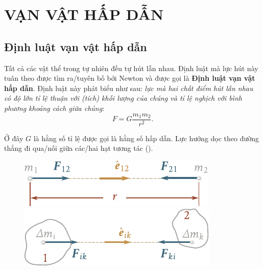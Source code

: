 








\chapter{VẠN VẬT HẤP DẪN}\label{chap:6}

\section{Định luật vạn vật hấp dẫn}\label{sec:6_1}

Tất cả các vật thể trong tự nhiên đều tự hút lẫn nhau. Định luật mà lực hút này tuân theo được tìm ra/tuyên bố bởi Newton và được gọi là \textbf {Định luật vạn vật hấp dẫn}. Định luật này phát biểu như sau: \textit {lực mà hai chất điểm hút lẫn nhau có độ lớn tỉ lệ  thuận với (tích) khối lượng của chúng và tỉ lệ nghịch với bình phương khoảng cách giữa chúng}:
\begin{equation}\label{eq:6_1}
	F = G\frac{m_1m_2}{r^2}.
\end{equation}

\noindent
Ở đây $G$ là hằng số tỉ lệ được gọi là hằng số hấp dẫn. Lực hướng dọc theo đường thẳng đi qua/nối giữa các/hai hạt tương tác ().

\begin{figure}[!htb]
	\begin{minipage}[t]{0.5\linewidth}
		\begin{center}
			\includegraphics[scale=0.95]{figures/ch_06/fig_6_1.pdf}
			\caption[]{}
			\label{fig:6_1}
		\end{center}
	\end{minipage}
	\hspace{-0.05cm}
	\begin{minipage}[t]{0.5\linewidth}
		\begin{center}
			\includegraphics[scale=1]{figures/ch_06/fig_6_2.pdf}
			\caption[]{}
			\label{fig:6_2}
		\end{center}
	\end{minipage}
\end{figure}

